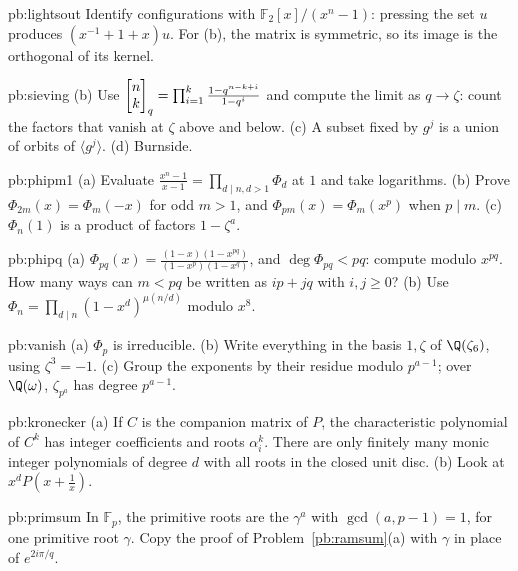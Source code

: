 \begin{hint}{pb:lightsout}
Identify configurations with $\mathbb F_2[x]/(x^n-1)$: pressing the set $u$ produces $(x^{-1}+1+x)u$. For (b), the matrix is
symmetric, so its image is the orthogonal of its kernel.
\end{hint}

\begin{hint}{pb:sieving}
(b) Use $\begin{bmatrix}n\\k\end{bmatrix}_q=\prod_{i=1}^k\frac{1-q^{n-k+i}}{1-q^i}$ and compute the limit as $q\to\zeta$: count the factors that
vanish at $\zeta$ above and below. (c) A subset fixed by $g^j$ is a union of orbits of $\langle g^j\rangle$. (d) Burnside.
\end{hint}

\begin{hint}{pb:phipm1}
(a) Evaluate $\frac{x^n-1}{x-1}=\prod_{d\mid n,d>1}\Phi_d$ at $1$ and take logarithms. (b) Prove $\Phi_{2m}(x)=\Phi_m(-x)$
for odd $m>1$, and $\Phi_{pm}(x)=\Phi_m(x^p)$ when $p\mid m$. (c) $\Phi_n(1)$ is a product of factors $1-\zeta^a$.
\end{hint}

\begin{hint}{pb:phipq}
(a) $\Phi_{pq}(x)=\frac{(1-x)(1-x^{pq})}{(1-x^p)(1-x^q)}$, and $\deg\Phi_{pq}<pq$: compute modulo $x^{pq}$. How many ways
can $m<pq$ be written as $ip+jq$ with $i,j\ge0$? (b) Use $\Phi_n=\prod_{d\mid n}(1-x^d)^{\mu(n/d)}$ modulo $x^8$.
\end{hint}

\begin{hint}{pb:vanish}
(a) $\Phi_p$ is irreducible. (b) Write everything in the basis $1,\zeta$ of $\Q(\zeta_6)$, using $\zeta^3=-1$. (c) Group the
exponents by their residue modulo $p^{a-1}$; over $\Q(\omega)$, $\zeta_{p^a}$ has degree $p^{a-1}$.
\end{hint}

\begin{hint}{pb:kronecker}
(a) If $C$ is the companion matrix of $P$, the characteristic polynomial of $C^k$ has integer coefficients and roots
$\alpha_i^k$. There are only finitely many monic integer polynomials of degree $d$ with all roots in the closed unit disc.
(b) Look at $x^dP(x+\frac1x)$.
\end{hint}

\begin{hint}{pb:primsum}
In $\mathbb F_p$, the primitive roots are the $\gamma^a$ with $\gcd(a,p-1)=1$, for one primitive root $\gamma$. Copy the
proof of Problem~\ref{pb:ramsum}(a) with $\gamma$ in place of $e^{2i\pi/q}$.
\end{hint}

